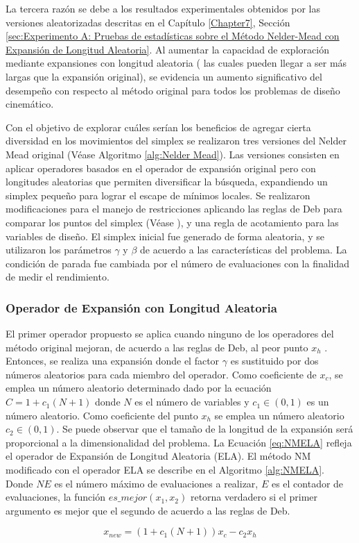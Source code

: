 La tercera razón se debe a los resultados experimentales obtenidos por las versiones aleatorizadas descritas en el Capítulo \ref{Chapter7}, Sección \ref{sec:Experimento A: Pruebas de estadísticas sobre el Método Nelder-Mead con Expansión de Longitud Aleatoria}. Al aumentar la capacidad de exploración mediante expansiones con longitud aleatoria ( las cuales pueden llegar a ser más largas que la expansión original), se evidencia un aumento significativo del desempeño con respecto al método original para todos los problemas de diseño cinemático.

Con el objetivo de explorar cuáles serían los beneficios de agregar cierta diversidad en los movimientos del simplex se realizaron tres versiones del Nelder Mead original (Véase Algoritmo \ref{alg:Nelder Mead}). Las versiones consisten en aplicar operadores basados en el operador de expansión original pero con longitudes aleatorias que permiten diversificar la búsqueda, expandiendo un simplex pequeño para lograr el escape de mínimos locales. Se realizaron modificaciones para el manejo de restricciones aplicando las reglas de Deb para comparar los puntos del simplex (Véase \cite{deb_efficient_1998}), y una regla de acotamiento para las variables de diseño. El simplex inicial fue generado de forma aleatoria, y se utilizaron los parámetros  $\gamma$ y $\beta$ de acuerdo a las características del problema. La condición de parada fue cambiada por el número de evaluaciones con la finalidad de medir el rendimiento. 

\subsubsection{Operador de Expansión con Longitud Aleatoria}

El primer operador propuesto se aplica cuando ninguno de los operadores del método original mejoran, de acuerdo a las reglas de Deb, al peor punto $x_h$ . Entonces, se realiza una expansión  donde el factor $\gamma$ es sustituido por dos números aleatorios para cada miembro del operador. Como coeficiente de   $x_c$, se emplea un número aleatorio determinado dado por la ecuación $C =1+c_1(N+1)$ donde $N$ es el número de variables y $c_1 \in (0,1)$ es un número aleatorio. Como coeficiente del punto $x_h$ se emplea un número aleatorio $c_2 \in (0,1)$. Se puede observar que el tamaño de la longitud de la expansión será proporcional a la dimensionalidad del problema. La Ecuación \ref{eq:NMELA} refleja el operador de Expansión de Longitud Aleatoria (ELA). El método NM modificado con el operador ELA se describe en el Algoritmo \ref{alg:NMELA}. Donde $NE$ es el número máximo de evaluaciones a realizar, $E$ es el contador de evaluaciones, la función $es\_mejor(x_1,x_2)$  retorna verdadero si el primer argumento es mejor que el segundo de acuerdo a las reglas de Deb.
\begin{center}
\begin{equation}\label{eq:NMELA}
x_{new}=(1+c_1(N+1))x_c-c_2 x_h
\end{equation}
\end{center}

